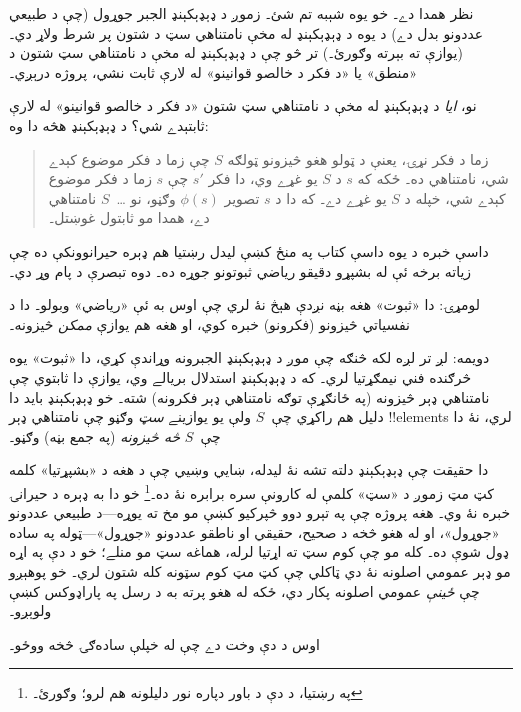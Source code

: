 \documentclass[../../../include/open-logic-section]{subfiles}
\begin{document}
نظر همدا دے۔ خو يوه شېبه تم شئ۔ زموږ د ډېډېکېنډ الجبر جوړول (چې
د طبيعي عددونو بدل دے) د يوه د ډېډېکېنډ له مخې نامتناهي سټ د شتون
پر شرط ولاړ دي۔ (يوازې 
ته بېرته وګورئ۔) تر څو چې د ډېډېکېنډ له مخې د نامتناهي سټ شتون د
«منطق» يا «د فکر د خالصو قوانينو» له لارې ثابت نشي، پروژه درېږي۔

نو، \emph{ايا} د ډېډېکېنډ له مخې د نامتناهي سټ شتون «د فکر د
خالصو قوانينو» له لارې ثابتېدے شي؟ د ډېډېکېنډ هڅه دا وه:
\begin{quote}
  زما د فکر نړۍ، يعنې د ټولو هغو څيزونو ټولګه $S$ چې زما د فکر
  موضوع کېدے شي، نامتناهي ده۔ ځکه که $s$ د $S$ يو غړے وي، دا فکر
  $s'$ چې $s$ زما د فکر موضوع کېدے شي، خپله د $S$ يو غړے دے۔
  که دا د $s$ تصوير $\phi(s)$ وګڼو، نو \dots~$S$ نامتناهي دے،
  همدا مو ثابتول غوښتل۔
  \citep[\S66]{Dedekind1888}
\end{quote}
داسې خبره د يوه داسې کتاب په منځ کښې ليدل رښتيا هم ډېره حيرانوونکې
ده چې زياته برخه ئې له بشپړو دقيقو رياضي ثبوتونو جوړه ده۔ دوه
تبصرې د پام وړ دي۔

لومړۍ: دا «ثبوت» هغه بڼه نږدې هېڅ نۀ لري چې اوس به ئې «رياضي»
وبولو۔ دا د نفسياتي څيزونو (فکرونو) خبره کوي، او هغه هم يوازې
\emph{ممکن} څيزونه۔

دويمه: لږ تر لږه لکه څنګه چې موږ د ډېډېکېنډ الجبرونه وړاندې کړي،
دا «ثبوت» يوه څرګنده فني نيمګړتيا لري۔ که د ډېډېکېنډ استدلال بريالے
وي، يوازې دا ثابتوي چې نامتناهي ډېر څيزونه (په ځانګړې توګه
نامتناهي ډېر فکرونه) شته۔ خو ډېډېکېنډ بايد دا دليل هم راکړي چې~$S$
ولې يو يوازينے \emph{سټ} وګڼو چې نامتناهي ډېر !!{element}s لري،
نۀ دا چې~$S$ \emph{څه څيزونه} (په جمع بڼه) وګڼو۔

دا حقيقت چې ډېډېکېنډ دلته تشه نۀ ليدله، ښايي وښيي چې د هغه د
«بشپړتيا» کلمه کټ مټ زموږ د «سټ» کلمې له کارونې سره برابره نۀ
ده۔\footnote{په رښتيا، د دې د باور دپاره نور دليلونه هم لرو؛
\citet[p.~23]{Potter2004} وګورئ۔} خو دا به ډېره د حيرانۍ خبره نۀ
وي۔ هغه پروژه چې په تېرو دوو څپرکيو کښې مو مخ ته يوړه---د طبيعي
عددونو «جوړول»، او له هغو څخه د صحيح، حقيقي او ناطقو عددونو
«جوړول»---ټوله په ساده ډول شوې ده۔ کله مو چې کوم سټ ته اړتيا لرله،
هماغه سټ مو منلے؛ خو د دې په اړه مو ډېر عمومي اصلونه نۀ دي ټاکلي
چې کټ مټ کوم سټونه کله شتون لري۔ خو پوهېږو چې \emph{ځينې} عمومي
اصلونه پکار دي، ځکه له هغو پرته به د رسل په پاراډوکس کښې ولوېږو۔

اوس د دې وخت دے چې له خپلې ساده‌ګۍ څخه ووځو۔
\end{document}
